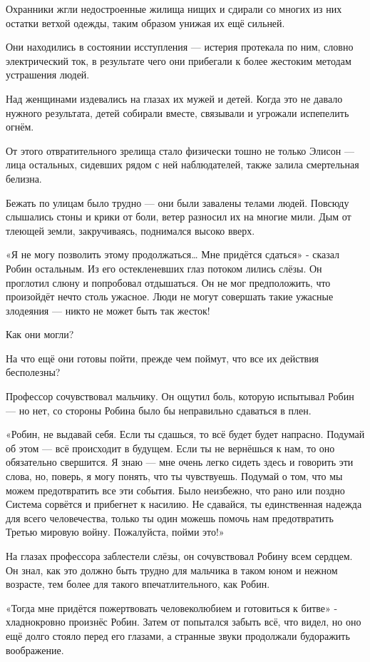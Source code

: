 \documentclass[a4paper,12pt]{book}
\begin{document}
\par
Охранники жгли недостроенные жилища нищих и сдирали со многих из них остатки ветхой одежды, таким образом унижая их ещё сильней.
\par
Они находились в состоянии исступления — истерия протекала по ним, словно электрический ток, в результате чего они прибегали к более жестоким методам устрашения людей.
\par
Над женщинами издевались на глазах их мужей и детей. Когда это не давало нужного результата, детей собирали вместе, связывали и угрожали испепелить огнём.
\par
От этого отвратительного зрелища стало физически тошно не только Элисон — лица остальных, сидевших рядом с ней наблюдателей, также залила смертельная белизна.\\
\par
Бежать по улицам было трудно — они были завалены телами людей. Повсюду слышались стоны и крики от боли, ветер разносил их на многие мили. Дым от тлеющей земли, закручиваясь, поднимался высоко вверх.
\par
«Я не могу позволить этому продолжаться… Мне придётся сдаться» - сказал Робин остальным. Из его остекленевших глаз потоком лились слёзы. Он проглотил слюну и попробовал отдышаться. Он не мог предположить, что произойдёт нечто столь ужасное. Люди не могут совершать такие ужасные злодеяния — никто не может быть так жесток!
\par
Как они могли?
\par
На что ещё они готовы пойти, прежде чем поймут, что все их действия бесполезны?\\
\par
Профессор сочувствовал мальчику. Он ощутил боль, которую испытывал Робин — но нет, со стороны Робина было бы неправильно сдаваться в плен.
\par
«Робин, не выдавай себя. Если ты сдашься, то всё будет будет напрасно. Подумай об этом — всё происходит в будущем. Если ты не вернёшься к нам, то оно обязательно свершится. Я знаю — мне очень легко сидеть здесь и говорить эти слова, но, поверь, я могу понять, что ты чувствуешь. Подумай о том, что мы можем предотвратить все эти события. Было неизбежно, что рано или поздно Система сорвётся и прибегнет к насилию. Не сдавайся, ты единственная надежда для всего человечества, только ты один можешь помочь нам предотвратить Третью мировую войну. Пожалуйста, пойми это!»
\par
На глазах профессора заблестели слёзы, он сочувствовал Робину всем сердцем. Он знал, как это должно быть трудно для мальчика в таком юном и нежном возрасте, тем более для такого впечатлительного, как Робин.\\
\par
«Тогда мне придётся пожертвовать человеколюбием и готовиться к битве» - хладнокровно произнёс Робин. Затем от попытался забыть всё, что видел, но оно ещё долго стояло перед его глазами, а странные звуки продолжали будоражить воображение.\\
\end{document}
